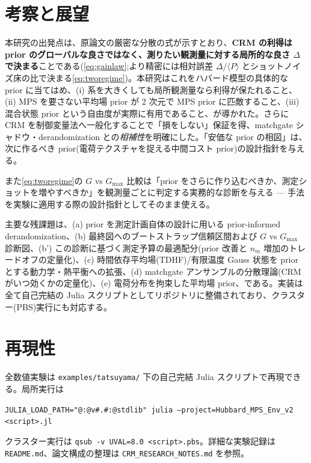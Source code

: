 \documentclass[11pt,a4paper]{ltjsarticle}
\newcommand{\ev}[1]{\langle #1\rangle}
\begin{document}
\section{考察と展望}

本研究の出発点は、原論文の厳密な分散の式が示すとおり、\textbf{CRM の利得は prior のグローバルな良さではなく、測りたい観測量に対する局所的な良さ $\Delta$ で決まる}ことである(\eqref{eq:gainlaw};より精密には相対誤差 $\Delta/\ev{P}$ とショットノイズ床の比で決まる\eqref{eq:tworegime})。本研究はこれをハバード模型の具体的な prior に当てはめ、(i) 系を大きくしても局所観測量なら利得が保たれること、(ii) MPS を要さない平均場 prior が 2 次元で MPS prior に匹敵すること、(iii) 混合状態 prior という自由度が実際に有用であること、が導かれた。さらに CRM を制御変量法へ一般化することで「損をしない」保証を得、matchgate シャドウ・derandomization との\emph{相補性}を明確にした。「安価な prior の相図」は、次に作るべき prior(電荷テクスチャを捉える中間コスト prior)の設計指針を与える。

また\eqref{eq:tworegime}の $G$ vs $G_{\max}$ 比較は「prior をさらに作り込むべきか、測定ショットを増やすべきか」を観測量ごとに判定する実務的な診断を与える — 手法を実験に適用する際の設計指針としてそのまま使える。

主要な残課題は、(a) prior を測定計画自体の設計に用いる prior-informed derandomization、(b) 最終図へのブートストラップ信頼区間および $G$ vs $G_{\max}$ 診断図、(b') この診断に基づく測定予算の最適配分(prior 改善と $n_m$ 増加のトレードオフの定量化)、(c) 時間依存平均場(TDHF)/有限温度 Gauss 状態を prior とする動力学・熱平衡への拡張、(d) matchgate アンサンブルの分散理論(CRM がいつ効くかの定量化)、(e) 電荷分布を拘束した平均場 prior、である。実装は全て自己完結の Julia スクリプトとしてリポジトリに整備されており、クラスター(PBS)実行にも対応する。

\section*{再現性}
全数値実験は \texttt{examples/tatsuyama/} 下の自己完結 Julia スクリプトで再現できる。局所実行は
\begin{center}
\texttt{JULIA\_LOAD\_PATH="@:@v\#.\#:@stdlib" julia --project=Hubbard\_MPS\_Env\_v2 <script>.jl}
\end{center}
クラスター実行は \texttt{qsub -v UVAL=8.0 <script>.pbs}。詳細な実験記録は \texttt{README.md}、論文構成の整理は \texttt{CRM\_RESEARCH\_NOTES.md} を参照。
\end{document}
